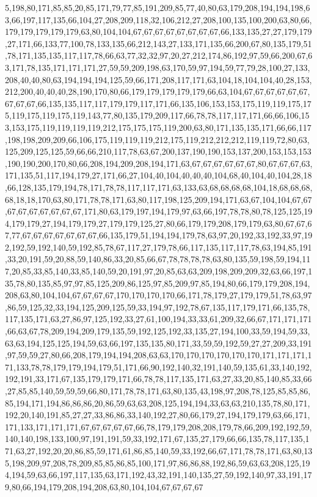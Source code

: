 5,198,80,171,85,85,20,85,171,79,77,85,191,209,85,77,40,80,63,179,208,194,194,198,63,66,197,117,135,66,104,27,208,209,118,32,106,212,27,208,100,135,100,200,63,80,66,179,179,179,179,179,63,80,104,104,67,67,67,67,67,67,67,67,66,133,135,27,27,179,179,27,171,66,133,77,100,78,133,135,66,212,143,27,133,171,135,66,200,67,80,135,179,51,78,171,135,135,117,117,78,66,63,77,32,32,97,20,27,212,174,86,192,97,59,66,200,67,63,171,78,135,171,171,171,27,59,59,209,198,63,170,59,97,194,59,77,79,28,100,27,133,208,40,40,80,63,194,194,194,125,59,66,171,208,117,171,63,104,18,104,104,40,28,153,212,200,40,40,40,28,190,170,80,66,179,179,179,179,179,66,63,104,67,67,67,67,67,67,67,67,67,66,135,135,117,117,179,179,117,171,66,135,106,153,153,175,119,119,175,175,119,175,119,175,119,143,77,80,135,179,209,117,66,78,78,117,117,171,66,66,106,153,153,175,119,119,119,119,212,175,175,175,119,200,63,80,171,135,135,171,66,66,117,198,198,209,209,66,106,175,119,119,119,212,175,119,212,212,212,119,119,72,80,63,125,209,125,125,59,66,66,210,117,78,63,67,200,137,190,190,153,137,200,153,153,153,190,190,200,170,80,66,208,194,209,208,194,171,63,67,67,67,67,67,67,80,67,67,67,63,171,135,51,117,194,179,27,171,66,27,104,40,104,40,40,40,104,68,40,104,40,104,28,18,66,128,135,179,194,78,171,78,78,117,117,171,63,133,63,68,68,68,68,104,18,68,68,68,68,18,18,170,63,80,171,78,78,171,63,80,117,198,125,209,194,171,63,67,104,104,67,67,67,67,67,67,67,67,67,171,80,63,179,197,194,179,97,63,66,197,78,78,80,78,125,125,194,179,179,27,194,179,179,27,179,179,125,27,80,66,179,179,208,179,179,63,80,67,67,67,77,67,67,67,67,67,67,67,66,135,179,51,194,194,179,78,63,97,20,192,33,192,33,97,192,192,59,192,140,59,192,85,78,67,117,27,179,78,66,117,135,117,117,78,63,194,85,191,33,20,191,59,20,88,59,140,86,33,20,85,66,67,78,78,78,78,63,80,135,59,198,59,194,117,20,85,33,85,140,33,85,140,59,20,191,97,20,85,63,63,209,198,209,209,32,63,66,197,135,78,80,135,85,97,97,85,125,209,86,125,97,85,209,97,85,194,80,66,179,179,208,194,208,63,80,104,104,67,67,67,67,170,170,170,170,66,171,78,179,27,179,179,51,78,63,97,86,59,125,32,33,194,125,209,125,59,33,194,97,192,78,67,135,117,179,171,66,135,78,117,135,171,63,27,86,97,125,192,33,27,61,100,194,33,33,61,209,32,66,67,171,171,171,66,63,67,78,209,194,209,179,135,59,192,125,192,33,135,27,194,100,33,59,194,59,33,63,63,194,125,125,194,59,63,66,197,135,135,80,171,33,59,59,192,59,27,27,209,33,191,97,59,59,27,80,66,208,179,194,194,208,63,63,170,170,170,170,170,170,171,171,171,171,133,78,78,179,179,194,179,51,171,66,90,192,140,32,191,140,59,135,61,33,140,192,192,191,33,171,67,135,179,179,171,66,78,78,117,135,171,63,27,33,20,85,140,85,33,66,27,85,85,140,59,59,59,66,80,171,78,78,171,63,80,135,43,198,97,208,78,125,85,85,86,85,194,171,194,86,86,86,20,86,59,63,63,208,125,194,194,33,63,63,210,135,78,80,171,192,20,140,191,85,27,27,33,86,86,33,140,192,27,80,66,179,27,194,179,179,63,66,171,171,133,171,171,171,67,67,67,67,67,66,78,179,179,208,208,179,78,66,209,192,192,59,140,140,198,133,100,97,191,191,59,33,192,171,67,135,27,179,66,66,135,78,117,135,171,63,27,192,20,20,86,85,59,171,61,86,85,140,59,33,192,66,67,171,78,78,171,63,80,135,198,209,97,208,78,209,85,85,86,85,100,171,97,86,86,88,192,86,59,63,63,208,125,194,194,59,63,66,197,117,135,63,171,192,43,32,191,140,135,27,59,192,140,97,33,191,179,80,66,194,179,208,194,208,63,80,104,104,67,67,67,67